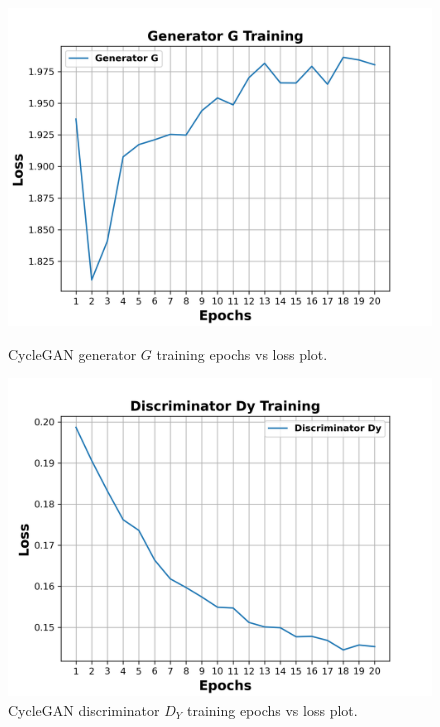 \begin{figure}[H]
  \centering
  \begin{minipage}[b]{0.49\textwidth}
    \includegraphics[width=\textwidth]{images/Evaluation/GeneratorGTraining.png}
    \caption[\ac{CycleGAN} generator $G$ training epochs vs loss plot.]{\ac{CycleGAN} generator $G$ training epochs vs loss plot.}
    \label{fig:generatorG}
  \end{minipage}
  \hfill
  \begin{minipage}[b]{0.49\textwidth}
    \includegraphics[width=\textwidth]{images/Evaluation/DiscriminatorDyTraining.png}
    \caption[\ac{CycleGAN} discriminator $D_Y$ training epochs vs loss plot.]{\ac{CycleGAN} discriminator $D_Y$ training epochs vs loss plot.}
    \label{fig:discriminatorDy}
  \end{minipage}
\end{figure}

